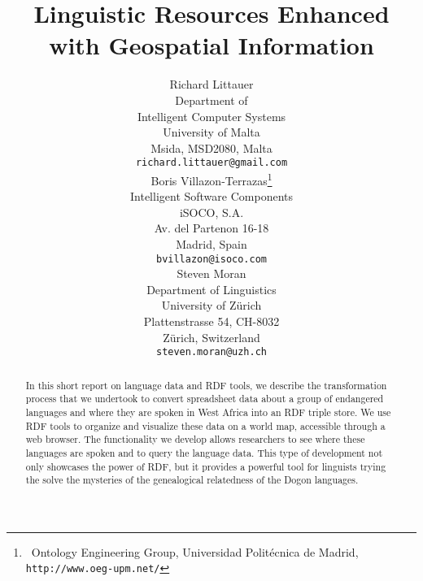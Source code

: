 \documentclass[11pt]{article}
\title{Linguistic Resources Enhanced with Geospatial Information}
\author{Richard Littauer \\
Department of \\
Intelligent Computer Systems \\
University of Malta \\ 
Msida, MSD2080, Malta \\
  {\tt \small richard.littauer@gmail.com} \\\And
   Boris Villazon-Terrazas\thanks{ \ Ontology Engineering Group, Universidad Polit\'ecnica de Madrid, {\tt http://www.oeg-upm.net/}} \\
   Intelligent Software Components \\
  iSOCO, S.A.\\
  Av. del Partenon 16-18 \\
  Madrid, Spain\\
{\tt \small bvillazon@isoco.com} \\\And
Steven Moran \\
Department of Linguistics \\
 University of Z\"urich \\
  Plattenstrasse 54, CH-8032 \\
  Z\"urich, Switzerland \\
  {\tt \small steven.moran@uzh.ch} \\}
\date{}
\begin{document}
\maketitle
\begin{abstract}

In this short report on language data and RDF tools, we describe the transformation process that we undertook to convert spreadsheet data about a group of endangered languages and where they are spoken in West Africa into an RDF triple store. We use RDF tools to organize and visualize these data on a world map, accessible through a web browser. The functionality we develop allows researchers to see where these languages are spoken and to query the language data. This type of development not only showcases the power of RDF, but it provides a powerful tool for linguists trying the solve the mysteries of the genealogical relatedness of the Dogon languages.

\end{abstract}
\end{document}
